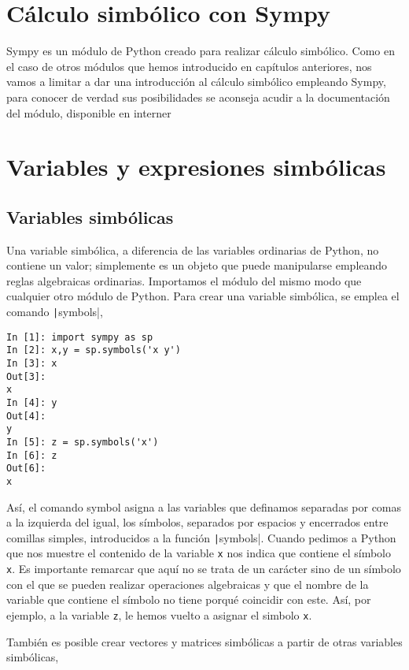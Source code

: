 \begin{paracol}{2}
\section{Cálculo simbólico con Sympy}
Sympy  es un módulo de Python creado para realizar cálculo simbólico. Como en el caso de otros módulos que hemos introducido en capítulos anteriores, nos vamos a limitar a dar una introducción al cálculo simbólico empleando Sympy, para conocer de verdad sus posibilidades se aconseja acudir a la documentación del módulo, disponible en interner
\section{Variables y expresiones simbólicas}
\subsection{Variables simbólicas} 
Una variable simbólica, a diferencia de las variables ordinarias de Python, no contiene un valor; simplemente es un objeto que puede manipularse empleando reglas  algebraicas ordinarias. Importamos el módulo del mismo modo que cualquier otro módulo de Python. Para crear una variable simbólica, se emplea el comando \texttt|symbols|,
\end{paracol}
\begin{center}
	\begin{minipage}{.3\textwidth}
		\begin{verbatim}
In [1]: import sympy as sp
In [2]: x,y = sp.symbols('x y')
In [3]: x
Out[3]: 
x
In [4]: y
Out[4]: 
y
In [5]: z = sp.symbols('x')
In [6]: z
Out[6]: 
x				
		\end{verbatim}
	\end{minipage}
\end{center}
\begin{paracol}{2}
Así, el comando symbol asigna a las variables que definamos separadas por comas a la izquierda del igual, los símbolos, separados por espacios y encerrados entre comillas simples, introducidos a la función \texttt|symbols|.
Cuando pedimos a Python que nos muestre el contenido de la variable \texttt{x} nos indica que contiene el símbolo \texttt{x}. Es importante remarcar que aquí no se trata de un carácter sino de un símbolo con el que se pueden realizar operaciones algebraicas y que el nombre de la variable que contiene el símbolo no tiene porqué coincidir con este. Así, por ejemplo, a la variable \texttt{z}, le hemos vuelto a asignar el simbolo \texttt{x}.

También es posible crear vectores y matrices simbólicas a partir de otras variables simbólicas,
\end{paracol}
